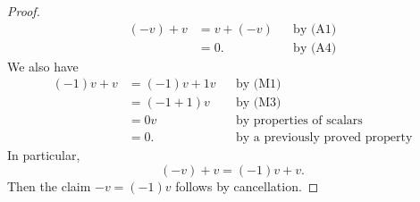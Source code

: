 \documentclass[11pt]{article}
\begin{document}
\begin{itemize}
\begin{proof}
            \begin{align*}
                (-v) + v &= v + (-v) && \text{by (A1)} \\
                         &= 0.       && \text{by (A4)}
            \end{align*}
            We also have
            \begin{align*}
                (-1)v + v &= (-1)v + 1v && \text{by (M1)} \\
                          &= (-1 + 1)v  && \text{by (M3)} \\
                          &= 0v         && \text{by properties of scalars} \\
                          &= 0.         && \text{by a previously proved property}
            \end{align*}
            In particular, \[(-v) + v = (-1)v + v.\] Then the claim \(-v = (-1)v\) follows by cancellation.
        \end{proof}
    \end{itemize}

    
\end{document}
